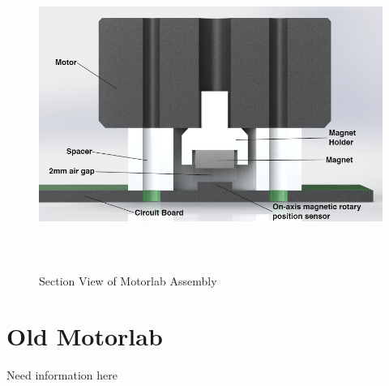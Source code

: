 \begin{figure}[htb]%

    \includegraphics[height=4in]{figures/section_view_motorlab_assembly.png}

    \caption[Optional: Section View of Motorlab Assembly]{Section View of Motorlab Assembly}

    \label{figure1}
\end{figure}


\section{Old Motorlab}
\label{makereference2.2} 

Need information here